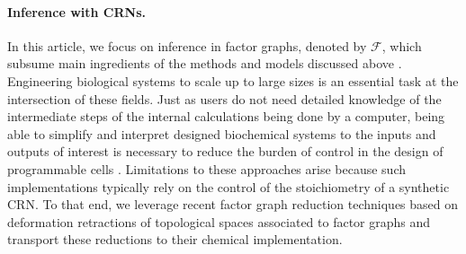 \documentclass{article}
\theoremstyle{plain}
\theoremstyle{definition}
\theoremstyle{remark}
\newcommand{\<}{\langle}
\renewcommand{\>}{\rangle}
\begin{document}
\paragraph{Inference with CRNs.}
In this article, we focus on inference in factor graphs, denoted by $\mathcal F$, which subsume main ingredients of the methods and models discussed above \cite{10.1098/rsif.2021.0031, NIPS2013_e5e63da7, 10.1098/rsif.2021.0031,  DBLP:journals/corr/abs-2109-11422, 10.1162/artl_a_00405}. Engineering biological systems to scale up to large sizes is an essential task at the intersection of these fields. Just as users do not need detailed knowledge of the intermediate steps of the internal calculations being done by a computer, being able to simplify and interpret designed biochemical systems to the inputs and outputs of interest is necessary to reduce the burden of control in the design of programmable cells \cite{Tschantz764969}.
Limitations to these approaches arise because such implementations typically rely on the control of the stoichiometry of a synthetic CRN. To that end, we leverage recent factor graph reduction techniques based on deformation retractions of topological spaces associated to factor graphs \cite{sergeantperthuis2025minimacriticalpointsbethe} and transport these reductions to their chemical implementation. 
\end{document}
